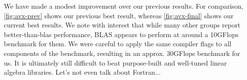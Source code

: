 \documentclass{scrartcl}
\begin{document}
  We have made a modest improvement over our previous results. For comparison, \autoref{fig:avx-prev} shows our previous best result, whereas \autoref{fig:avx-final} shows our current best results. We note with interest that while many other groups report better-than-blas performance, BLAS appears to perform at around a 10GFlops benchmark for them. We were careful to apply the same compiler flags to all components of the benchmark, resulting in an approx. 30GFlops benchmark for us. It is ultimately still difficult to beat purpose-built and well-tuned linear algebra libraries. Let's not even talk about Fortran...
\end{document}
